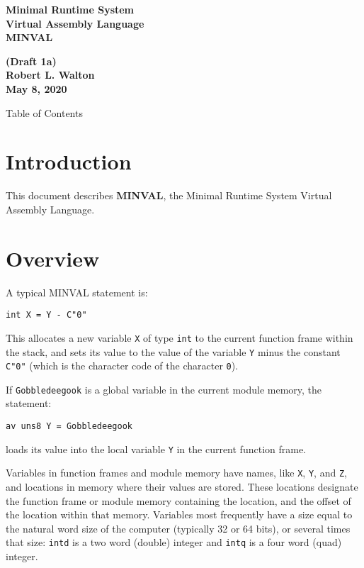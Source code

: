 \documentclass[12pt]{article}
\makeatletter
\renewcommand\tableofcontents{%
    \begin{list}{}%
	     {\setlength{\itemsep}{0in}%
	      \setlength{\topsep}{0in}%
	      \setlength{\parsep}{1ex}%
	      \setlength{\labelwidth}{0in}%
	      \setlength{\baselineskip}{1.5ex}%
	      \setlength{\leftmargin}{0.8in}%
	      \setlength{\rightmargin}{0.8in}}%
    \item\@starttoc{toc}%
    \end{list}}
\newcommand{\key}[1]{{\rm \bfseries #1}}
\makeatother
\begin{document}
        
\begin{center}
\Large \bf
Minimal Runtime System\\
Virtual Assembly Language\\[0.5ex]
\huge \bf
MINVAL
\end{center}
\begin{center}
\large \bf
(Draft 1a)
\\[0.5ex]
Robert L. Walton\\
May 8, 2020

\bigskip
 
Table of Contents
\end{center}

\bigskip

\tableofcontents 

\newpage

\section{Introduction}

This document describes \key{MINVAL}, the Minimal Runtime System Virtual
Assembly Language.

\section{Overview}

A typical MINVAL statement is:
\begin{center}
\tt int X = Y - C"0"
\end{center}
This allocates a new variable {\tt X} of type {\tt int}
to the current function frame within the stack,
and sets its value to the value of the
variable {\tt Y} minus the constant {\tt C"0"} (which is
the character code of the character {\tt 0}).

If {\tt Gobbledeegook} is a global variable in the current
module memory, the statement:
\begin{center}
\tt av uns8 Y = Gobbledeegook
\end{center}
loads its value into the local variable
{\tt Y} in the current function frame.

Variables in function frames and module memory
have names, like {\tt X}, {\tt Y}, and {\tt Z},
and locations in memory where their values are stored.
These locations designate the
function frame or module memory containing the location,
and the offset of the location within that memory.
Variables most frequently
have a size equal to the natural
word size of the computer (typically 32 or 64 bits), or
several times that size: {\tt intd} is a two word (double) integer
and {\tt intq} is a four word (quad) integer.
\end{document}

